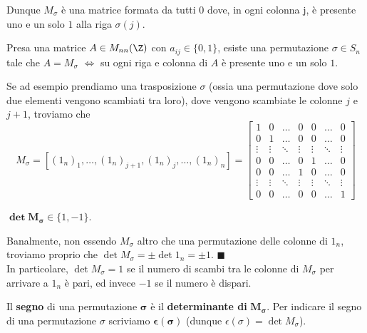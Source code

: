 \documentclass[11pt, a4paper, titlepage, oneside]{scrbook}
\begin{document}
Dunque $M_\sigma$ è una matrice formata da tutti $0$ dove, in ogni colonna j, è presente uno e un solo $1$ alla riga $\sigma(j)$.

\begin{Osservazione}[]
\label{oss-matrice-permutazioni-1}
Presa una matrice $A \in M_{nn}(\Z)$ con $a_{ij} \in \{0, 1\}$, esiste una permutazione $\sigma \in S_n$ tale che $A = M_\sigma$ $\iff$ su ogni riga e colonna di $A$ è presente uno e un solo $1$.
\end{Osservazione}

Se ad esempio prendiamo una trasposizione $\sigma$ (ossia una permutazione dove solo due elementi vengono scambiati tra loro), dove vengono scambiate le colonne $j$ e $j+1$, troviamo che
\[
M_\sigma = [(1_n)_1, \ldots, (1_n)_{j+1}, (1_n)_j, \ldots, (1_n)_n] = \begin{bmatrix}
    1 & 0 & \dots & 0 & 0 & \dots & 0 \\
    0 & 1 & \dots & 0 & 0 & \dots & 0 \\
    \vdots & \vdots & \ddots & \vdots & \vdots & \ddots & \vdots \\
    0 & 0 & \dots & 0 & 1 & \dots & 0 \\
    0 & 0 & \dots & 1 & 0 & \dots & 0 \\
    \vdots & \vdots & \ddots & \vdots & \vdots & \ddots & \vdots \\
    0 & 0 & \dots & 0 & 0 & \dots & 1
\end{bmatrix}
\] 

\begin{Osservazione}[]
\label{oss-matrice-permutazione-2}
$\bm{\det M_\sigma} \in \{1, -1\}$.
\end{Osservazione}

\Dimostrazione \nopagebreak

Banalmente, non essendo $M_\sigma$ altro che una permutazione delle colonne di $1_n$, troviamo proprio che $\det M_\sigma = \pm \det 1_n = \pm 1$. $\blacksquare$  \\
In particolare, $\det M_\sigma = 1$ se il numero di scambi tra le colonne di $M_\sigma$ per arrivare a $1_n$ è pari, ed invece $-1$ se il numero è dispari.

\begin{Definizione}
\label{def-segno-permutazione}
Il \textbf{segno} di una permutazione $\bm{\sigma}$ è il \textbf{determinante di} $\bm{M_\sigma}$. Per indicare il segno di una permutazione $\sigma$ scriviamo $\bm{\epsilon(\sigma)}$ (dunque $\epsilon(\sigma) = \det M_\sigma$).
\end{Definizione}
\end{document}
